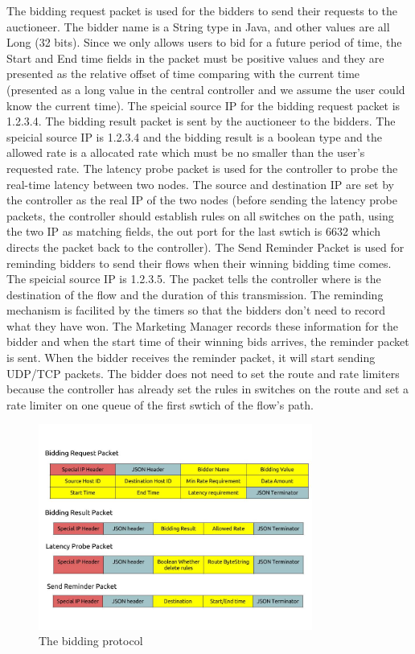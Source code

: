 \documentclass[a4paper,11pt,twocolumn]{article}
\begin{document}
The bidding request packet is used for the bidders to send their requests to the auctioneer. The bidder name is a String type in Java, and other 
values are all Long (32 bits). Since we only allows users to bid 
for a future period of time, the Start and End time fields in the packet must be positive values and they 
are presented as the relative offset of time comparing with the current time (presented as a long value in the central controller and
we assume the user could know the current time). The speicial source IP for the bidding request packet is 1.2.3.4. The bidding result packet is sent by the auctioneer to the 
bidders. The speicial source IP is 1.2.3.4 and the bidding result is a boolean type and the allowed rate is a allocated rate which must be no smaller than the 
user's requested rate. The latency probe packet is used for the controller to probe the real-time latency between two nodes. The source and destination IP
are set by the controller as the real IP of the two nodes (before sending the latency probe packets, the controller should establish rules on all
switches on the path, using the two IP as matching fields, the out port for the last swtich is 6632 which directs the packet back to the controller).
The Send Reminder Packet is used for reminding bidders to send their flows when their winning bidding time comes. The speicial source IP is 1.2.3.5. The 
packet tells the controller where is the destination of the flow and the duration of this transmission. The reminding mechanism is facilited by the 
timers so that the bidders don't need to record what they have won. The Marketing Manager records these information for the bidder and when the start time 
of their winning bids arrives, the reminder packet is sent. When the bidder receives the reminder packet, it will start sending UDP/TCP packets. The 
bidder does not need to set the route and rate limiters because the controller has already set the rules in switches on the route and set a rate 
limiter on one queue of the first swtich of the flow's path.

\begin{figure}[ht!]
\centering
\includegraphics[width=90mm]{protocol.jpg}
\caption{The bidding protocol}
\label{overflow}
\end{figure}
\end{document}
